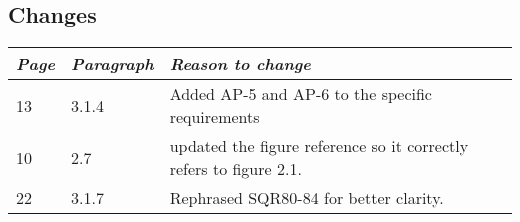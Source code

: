 \subsection*{Changes}
\begin{tabular}{lll}
    \toprule
    \emph{Page} & \emph{Paragraph} & \emph{Reason to change} \\
    \midrule
    13 & 3.1.4  & Added AP-5 and AP-6 to the specific requirements\\
    10 & 2.7 & updated the figure reference so it correctly refers to figure 2.1.\\
    22 & 3.1.7 & Rephrased SQR80-84 for better clarity.\\
    \bottomrule
\end{tabular}